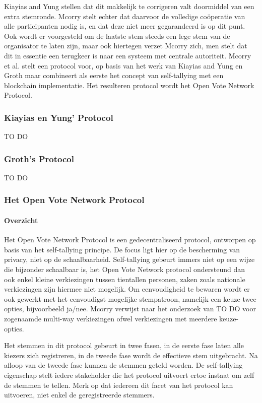 		Kiayias and Yung  stellen dat dit makkelijk te corrigeren valt doormiddel van een extra stemronde. Mcorry stelt echter dat daarvoor de volledige coöperatie van alle participanten nodig is, en dat deze niet meer gegarandeerd is op dit punt. Ook wordt er voorgesteld om de laatste stem steeds een lege stem van de organisator te laten zijn, maar ook hiertegen verzet Mcorry zich, men stelt dat dit in essentie een terugkeer is naar een systeem met centrale autoriteit.  Mcorry et al. stelt een protocol voor, op basis van het werk van Kiayias and Yung en Groth maar combineert als eerste het concept van self-tallying met een blockchain implementatie. Het resulteren protocol wordt het Open Vote Network Protocol.
		\subsubsection{Kiayias en Yung' Protocol}
			TO DO
		\subsubsection{Groth's Protocol}
			TO DO
		\subsubsection{Het Open Vote Network Protocol}
			\paragraph*{Overzicht }
			Het Open Vote Network Protocol is een gedecentraliseerd protocol, ontworpen op basis van het self-tallying principe. De focus ligt hier op de bescherming van privacy, niet op de schaalbaarheid. Self-tallying gebeurt immers niet op een wijze die bijzonder schaalbaar is, het  Open Vote Network protocol ondersteund dan ook enkel kleine verkiezingen tussen tientallen personen, zaken zoals nationale verkiezingen zijn hiermee niet mogelijk. Om eenvoudigheid te bewaren wordt er ook gewerkt met het eenvoudigst mogelijke stempatroon, namelijk een keuze twee opties, bijvoorbeeld ja/nee.  Mcorry verwijst naar het onderzoek van TO DO voor zogenaamde multi-way verkiezingen ofwel verkiezingen met meerdere keuze-opties.
			
			Het stemmen in dit protocol gebeurt in twee fasen, in de eerste fase laten alle kiezers zich registreren, in de tweede fase wordt de effectieve stem uitgebracht. Na afloop van de tweede fase kunnen de stemmen geteld worden.  De self-tallying eigenschap stelt iedere stakeholder die het protocol uitvoert ertoe instaat om zelf de stemmen te tellen. Merk op dat iedereen dit facet van het protocol kan uitvoeren, niet enkel de geregistreerde stemmers.
			 
